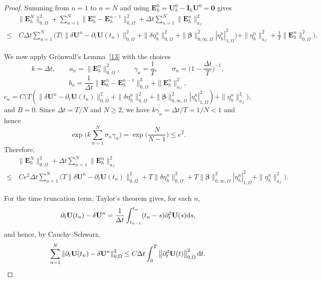 \documentclass[final,12pt]{amsart}
\theoremstyle{plain}
\theoremstyle{definition}
\newcommand\bbeta{{\boldsymbol{\beta}}}
\newcommand\bU{\mathbf{U}}
\newcommand\bE{\mathbf{E}}
\begin{document}
\begin{proof}
Summing from $n=1$ to $n=N$ and using $\bE_h^{0}=\bU_h^0-\mathbf I_h\bU^0=\mathbf 0$ gives
\begin{equation}
	\begin{aligned}\label{error432}
	&\|\bE_h^N \|_{0,\Omega}^2
	+\sum_{n=1}^{N}\|\bE_h^n - \bE_h^{n-1}\|_{0,\Omega}^2
	+ \Delta t \sum_{n=1}^{N}\|\bE_h^n \|_{a_{J}}^{2}\\
	\leq&\, C\Delta t\sum_{n=1}^{N}\bigg(
	T\Big(\|\delta \bU^{n}-\partial_{t}\bU(t_n)\|_{0,\Omega}^{2}
	+\|\delta\eta_h^n\|_{0,\Omega}^{2}
	+\|\bbeta\|_{0,\infty,\Omega}^{2} |\eta_h^n|_{1,\Omega}^{2}\Big)
	+\|\eta_h^n\|_{a_J}^{2}
	+\frac{1}{T}\|\bE_h^n\|_{0,\Omega}^{2}\bigg).
	\end{aligned}
\end{equation}

We now apply Gr\"{o}nwall's Lemma~\ref{13} with the choices
\[
	k=\Delta t,\qquad
	a_n=\|\bE_h^n\|_{0,\Omega}^2,\qquad
	\gamma_n=\frac{1}{T},\qquad
	\sigma_n=\Big(1-\frac{\Delta t}{T}\Big)^{-1},
\]
\[
	b_n=\frac{1}{\Delta t}\|\bE_h^n-\bE_h^{n-1}\|_{0,\Omega}^2+\|\bE_h^n\|_{a_J}^{2},
	\]
\[
	c_n=C\Big(T(\|\delta \bU^{n}-\partial_{t}\bU(t_n)\|_{0,\Omega}^{2}
	+\|\delta\eta_h^n\|_{0,\Omega}^{2}
	+\|\bbeta\|_{0,\infty,\Omega}^{2} |\eta_h^n|_{1,\Omega}^{2})
	+\|\eta_h^n\|_{a_J}^{2}\Big),
\]
and $B=0$. Since $\Delta t=T/N$ and $N\ge 2$, we have $k\gamma_n=\Delta t/T=1/N<1$ and hence
\[
	\exp\Big(k\sum_{n=1}^{N}\sigma_n\gamma_n\Big)
	=\exp\Big(\frac{N}{N-1}\Big)\le e^{2}.
\]
Therefore,
\begin{align}
	&\|\bE_h^N \|_{0,\Omega}^2+\Delta t \sum_{n=1}^{N}\|\bE_h^n \|_{a_{J}}^{2} \nonumber\\
	\leq&\,  C e^{2} \Delta t\sum_{n=1}^{N}\Big(
	T\|\delta \bU^{n}-\partial_{t}\bU(t_n)\|_{0,\Omega}^{2}
	+T\|\delta\eta_h^n\|_{0,\Omega}^{2}
	+T\|\bbeta\|_{0,\infty,\Omega}^{2} |\eta_h^n|_{1,\Omega}^{2}
	+\|\eta_h^n\|_{a_J}^{2}\Big).\label{53last}
\end{align}

For the time truncation term, Taylor's theorem gives, for each $n$,
\[
	\partial_t \bU(t_n)-\delta \bU^n
	=\frac{1}{\Delta t}\int_{t_{n-1}}^{t_n}(t_n-s) \partial_t^2\bU(s) {\rm d}s,
\]
and hence, by Cauchy--Schwarz,
\begin{equation}
	\sum_{n=1}^{N} \left\|\partial_t\mathbf{U}(t_{n})-\delta \mathbf{U}^n\right\|_{0,\Omega}^2
	\leq C\Delta t\int_{0}^{T} \left\|\partial_{t}^{2}\mathbf{U}(t)\right\|_{0,\Omega}^2 {\rm d}t.  \label{time_trunc}
\end{equation}


\end{proof}
\end{document}
